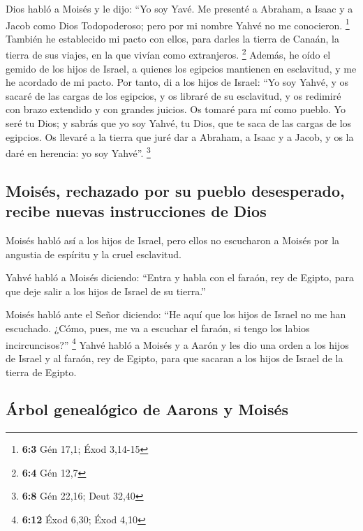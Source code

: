  Dios habló a Moisés y le dijo: ``Yo soy Yavé.
 Me presenté a Abraham, a Isaac y a Jacob como Dios
Todopoderoso; pero por mi nombre Yahvé no me conocieron. \footnote{\textbf{6:3}
  Gén 17,1; Éxod 3,14-15}  También he establecido mi pacto
con ellos, para darles la tierra de Canaán, la tierra de sus viajes, en
la que vivían como extranjeros. \footnote{\textbf{6:4} Gén 12,7}
 Además, he oído el gemido de los hijos de Israel, a
quienes los egipcios mantienen en esclavitud, y me he acordado de mi
pacto.  Por tanto, di a los hijos de Israel: ``Yo soy
Yahvé, y os sacaré de las cargas de los egipcios, y os libraré de su
esclavitud, y os redimiré con brazo extendido y con grandes juicios.
 Os tomaré para mí como pueblo. Yo seré tu Dios; y sabrás
que yo soy Yahvé, tu Dios, que te saca de las cargas de los egipcios.
 Os llevaré a la tierra que juré dar a Abraham, a Isaac y
a Jacob, y os la daré en herencia: yo soy Yahvé''. \footnote{\textbf{6:8}
  Gén 22,16; Deut 32,40}

\hypertarget{moisuxe9s-rechazado-por-su-pueblo-desesperado-recibe-nuevas-instrucciones-de-dios}{%
\subsection{Moisés, rechazado por su pueblo desesperado, recibe nuevas
instrucciones de
Dios}\label{moisuxe9s-rechazado-por-su-pueblo-desesperado-recibe-nuevas-instrucciones-de-dios}}

 Moisés habló así a los hijos de Israel, pero ellos no
escucharon a Moisés por la angustia de espíritu y la cruel esclavitud.

 Yahvé habló a Moisés diciendo:  ``Entra y
habla con el faraón, rey de Egipto, para que deje salir a los hijos de
Israel de su tierra.''

 Moisés habló ante el Señor diciendo: ``He aquí que los
hijos de Israel no me han escuchado. ¿Cómo, pues, me va a escuchar el
faraón, si tengo los labios incircuncisos?'' \footnote{\textbf{6:12}
  Éxod 6,30; Éxod 4,10}  Yahvé habló a Moisés y a Aarón y
les dio una orden a los hijos de Israel y al faraón, rey de Egipto, para
que sacaran a los hijos de Israel de la tierra de Egipto.

\hypertarget{uxe1rbol-genealuxf3gico-de-aarons-y-moisuxe9s}{%
\subsection{Árbol genealógico de Aarons y
Moisés}\label{uxe1rbol-genealuxf3gico-de-aarons-y-moisuxe9s}}

